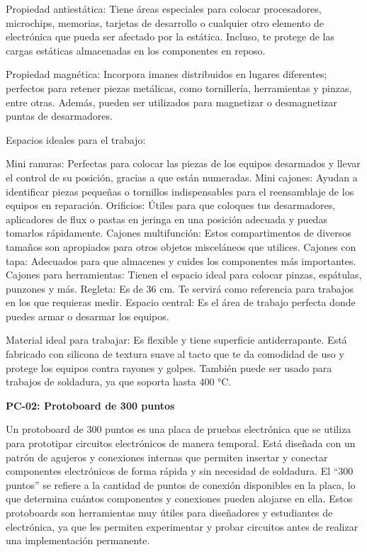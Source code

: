     Propiedad antiestática: Tiene áreas especiales para colocar procesadores, microchips, memorias, tarjetas de desarrollo o cualquier otro elemento de electrónica que pueda ser afectado por la estática. Incluso, te protege de las cargas estáticas almacenadas en los componentes en reposo.
    
    
    Propiedad magnética: Incorpora imanes distribuidos en lugares diferentes; perfectos para retener piezas metálicas, como tornillería, herramientas y pinzas, entre otras. Además, pueden ser utilizados para magnetizar o desmagnetizar puntas de desarmadores.
    
    
    Espacios ideales para el trabajo:
    
    Mini ranuras: Perfectas para colocar las piezas de los equipos desarmados y llevar el control de su posición, gracias a que están numeradas.
    Mini cajones: Ayudan a identificar piezas pequeñas o tornillos indispensables para el reensamblaje de los equipos en reparación.
    Orificios: Útiles para que coloques tus desarmadores, aplicadores de flux o pastas en jeringa en una posición adecuada y puedas tomarlos rápidamente.
    Cajones multifunción: Estos compartimentos de diversos tamaños son apropiados para otros objetos misceláneos que utilices.
    Cajones con tapa: Adecuados para que almacenes y cuides los componentes más importantes.
    Cajones para herramientas: Tienen el espacio ideal para colocar pinzas, espátulas, punzones y más.
    Regleta: Es de 36 cm. Te servirá como referencia para trabajos en los que requieras medir.
    Espacio central: Es el área de trabajo perfecta donde puedes armar o desarmar los equipos.
    
    Material ideal para trabajar: Es flexible y tiene superficie antiderrapante. Está fabricado con silicona de textura suave al tacto que te da comodidad de uso y protege los equipos contra rayones y golpes. También puede ser usado para trabajos de soldadura, ya que soporta hasta 400 °C.
    
    
    
    \textbf{PC-02: Protoboard de 300 puntos}
    
    Un protoboard de 300 puntos es una placa de pruebas electrónica que se utiliza para prototipar circuitos electrónicos de manera temporal. Está diseñada con un patrón de agujeros y conexiones internas que permiten insertar y conectar componentes electrónicos de forma rápida y sin necesidad de soldadura. El “300 puntos” se refiere a la cantidad de puntos de conexión disponibles en la placa, lo que determina cuántos componentes y conexiones pueden alojarse en ella. Estos protoboards son herramientas muy útiles para diseñadores y estudiantes de electrónica, ya que les permiten experimentar y probar circuitos antes de realizar una implementación permanente.
    
